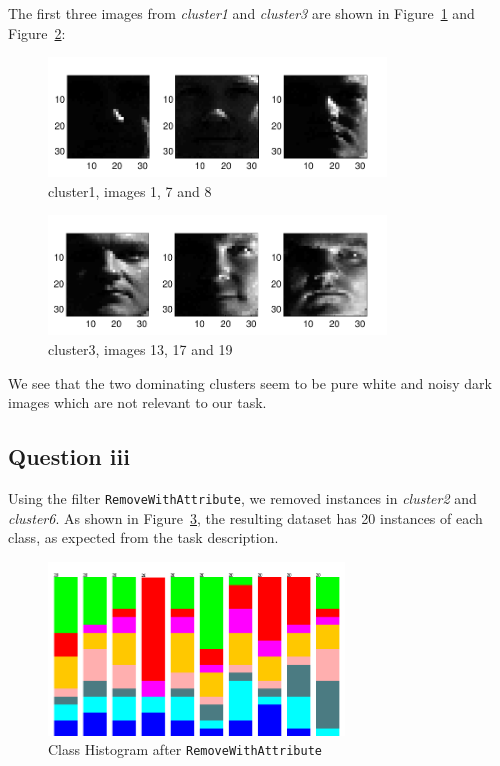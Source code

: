 \documentclass[a4paper]{article}
\begin{document}
\clearpage

The first three images from {\it cluster1} and {\it cluster3} are shown in Figure~\ref{fig:a2img5} and Figure~\ref{fig:a2img6}:

\begin{figure}[!htbp]
\centering
\includegraphics[width=0.8\textwidth]{A2-img5-cluster1-cropped.pdf}
\caption{cluster1, images 1, 7 and 8}
\label{fig:a2img5}
\end{figure}

\begin{figure}[!htbp]
\centering
\includegraphics[width=0.8\textwidth]{A2-img6-cluster3-cropped.pdf}
\caption{cluster3, images 13, 17 and 19}
\label{fig:a2img6}
\end{figure}

We see that the two dominating clusters seem to be pure white and noisy dark images which are not relevant to our task.

\subsection*{Question iii}
Using the filter {\tt RemoveWithAttribute}, we removed instances in {\it cluster2} and {\it cluster6}. As shown in Figure~\ref{fig:a3img1}, the resulting dataset has 20 instances of each class, as expected from the task description.

\begin{figure}[!htbp]
\centering
\includegraphics[width=0.7\textwidth]{A2-img3-remjunk-cropped.png}
\caption{Class Histogram after {\tt RemoveWithAttribute}}
\label{fig:a3img1}
\end{figure}
\end{document}
